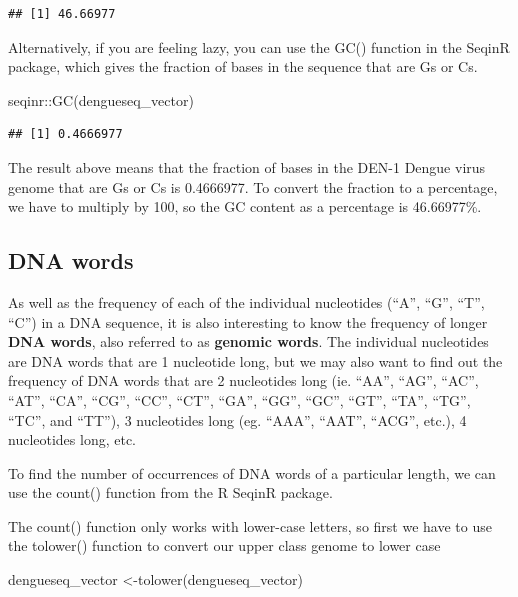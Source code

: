 \documentclass[
]{book}
\newenvironment{Shaded}{\begin{snugshade}}{\end{snugshade}}
\newcommand{\FunctionTok}[1]{\textcolor[rgb]{0.00,0.00,0.00}{#1}}
\newcommand{\NormalTok}[1]{#1}
\newcommand{\OtherTok}[1]{\textcolor[rgb]{0.56,0.35,0.01}{#1}}
\newcommand{\SpecialCharTok}[1]{\textcolor[rgb]{0.00,0.00,0.00}{#1}}
\begin{document}
\begin{verbatim}
## [1] 46.66977
\end{verbatim}

Alternatively, if you are feeling lazy, you can use the GC() function in the SeqinR package, which gives the fraction of bases in the sequence that are Gs or Cs.

\begin{Shaded}
\begin{Highlighting}[]
\NormalTok{seqinr}\SpecialCharTok{::}\FunctionTok{GC}\NormalTok{(dengueseq\_vector)}
\end{Highlighting}
\end{Shaded}

\begin{verbatim}
## [1] 0.4666977
\end{verbatim}

The result above means that the fraction of bases in the DEN-1 Dengue virus genome that are Gs or Cs is 0.4666977. To convert the fraction to a percentage, we have to multiply by 100, so the GC content as a percentage is 46.66977\%.

\hypertarget{dna-words}{%
\subsection{DNA words}\label{dna-words}}

As well as the frequency of each of the individual nucleotides (``A'', ``G'', ``T'', ``C'') in a DNA sequence, it is also interesting to know the frequency of longer \textbf{DNA words}, also referred to as \textbf{genomic words}. The individual nucleotides are DNA words that are 1 nucleotide long, but we may also want to find out the frequency of DNA words that are 2 nucleotides long (ie. ``AA'', ``AG'', ``AC'', ``AT'', ``CA'', ``CG'', ``CC'', ``CT'', ``GA'', ``GG'', ``GC'', ``GT'', ``TA'', ``TG'', ``TC'', and ``TT''), 3 nucleotides long (eg. ``AAA'', ``AAT'', ``ACG'', etc.), 4 nucleotides long, etc.

To find the number of occurrences of DNA words of a particular length, we can use the count() function from the R SeqinR package.

The count() function only works with lower-case letters, so first we have to use the tolower() function to convert our upper class genome to lower case

\begin{Shaded}
\begin{Highlighting}[]
\NormalTok{dengueseq\_vector }\OtherTok{\textless{}{-}}\FunctionTok{tolower}\NormalTok{(dengueseq\_vector)}
\end{Highlighting}
\end{Shaded}
\end{document}
